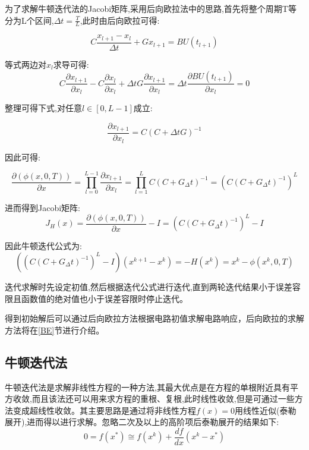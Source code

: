 \documentclass[12pt]{article}
\begin{document}
\begin{sloppypar}
\qquad 为了求解牛顿迭代法的Jacobi矩阵,采用后向欧拉法中的思路,首先将整个周期T等分为L个区间,$\Delta t = \frac{T}{L}$,此时由后向欧拉可得:

\begin{equation}
  C \frac{x_{l+1}-x_l}{\Delta t}  + G x_{l+1}= BU(t_{l+1}) 
\end{equation}

\qquad 等式两边对$x_l$求导可得:
\begin{equation}
  C \frac{\partial x_{l+1}}{\partial x_{l}} - C \frac{\partial x_l}{\partial x_{l}}  + \Delta t G\frac{\partial x_{l+1}}{\partial x_{l}} = \Delta t \frac{\partial BU(t_{l+1})}{\partial x_{l}} = 0
\end{equation}

\qquad 整理可得下式,对任意$l \in [0,L-1]$成立:

\begin{equation}
  \frac{\partial x_{l+1}}{\partial x_{l}} = C(C+\Delta t G)^{-1}
\end{equation}

\qquad 因此可得:

\begin{equation}
  \frac{\partial(\phi(x, 0, T))}{\partial x} = \prod_{l=0}^{L-1} \frac{\partial x_{l+1}}{\partial x_{l}} = \prod_{l=1}^L C\left(C+G_{\Delta} t\right)^{-1}=\left(C\left(C+G_{\Delta} t\right)^{-1}\right)^L
\end{equation}

\qquad 进而得到Jacobi矩阵:
\begin{equation}
  J_H(x) = \frac{\partial(\phi(x, 0, T))}{\partial x} - I = \left(C\left(C+G_{\Delta} t\right)^{-1}\right)^L - I
\end{equation}

\qquad 因此牛顿迭代公式为:
\begin{equation}
  \left(\left(C\left(C+G_{\Delta} t\right)^{-1}\right)^L - I \right) \left(x^{k+1}-x^k\right)=-H\left(x^k\right) = x^k - \phi(x^k,0,T)
\end{equation}

\qquad 迭代求解时先设定初值,然后根据迭代公式进行迭代,直到两轮迭代结果小于误差容限且函数值的绝对值也小于误差容限时停止迭代。

\qquad 得到初始解后可以通过后向欧拉方法根据电路初值求解电路响应，后向欧拉的求解方法将在\ref{BE}节进行介绍。

\subsection{牛顿迭代法}
\qquad 牛顿迭代法是求解非线性方程的一种方法,其最大优点是在方程的单根附近具有平方收敛,而且该法还可以用来求方程的重根、复根,此时线性收敛,但是可通过一些方法变成超线性收敛。其主要思路是通过将非线性方程$f(x) = 0$用线性近似(泰勒展开),进而得以进行求解。忽略二次及以上的高阶项后泰勒展开的结果如下:
\begin{equation}
  0=f\left(x^*\right) \cong f\left(x^k\right)+\frac{d f}{d x}\left(x^k-x^*\right)
\end{equation}


\end{sloppypar}
\end{document}
